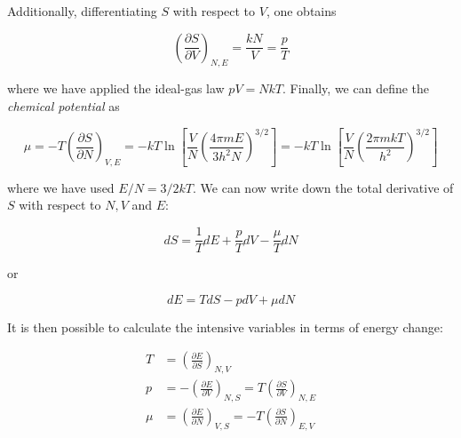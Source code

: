 \documentclass[12pt,a4paper]{report}
\newcommand{\esp}{\vspace{0.5cm}}
\begin{document}
	\esp
	
	\noindent Additionally, differentiating $S$ with respect to $V$, one obtains
	
	\esp
	
	\begin{equation}
		\left( \frac{\partial S}{\partial V} \right)_{N,E} = \frac{kN}{V} = \frac{p}{T}
	\end{equation}
	
	\esp
	
	\noindent where we have applied the ideal-gas law $pV = NkT$. Finally, we can define the \textit{chemical potential} as
	
	\esp
	
	\begin{equation}
		\mu = -T \left( \frac{\partial S}{\partial N} \right)_{V,E} = -kT \ln \left[ \frac{V}{N} \left( \frac{4\pi mE}{3h^2 N} \right)^{3/2} \right] = -kT \ln \left[ \frac{V}{N} \left( \frac{2\pi mkT}{h^2} \right)^{3/2} \right]
	\end{equation}
	
	\esp
	
	\noindent where we have used $E/N = 3/2 kT$. We can now write down the total derivative of $S$ with respect to $N, V$ and $E$:
	
	\esp
	
	\begin{equation}
		dS = \frac{1}{T} dE + \frac{p}{T} dV - \frac{\mu}{T} dN
	\end{equation}
	
	\esp
	
	\noindent or
	
	\esp
	
	\begin{equation}
		dE = T dS - p dV + \mu dN
	\end{equation}
	
	\esp
	
	\noindent It is then possible to calculate the intensive variables in terms of energy change:
	
	\esp
	
	\begin{align}
		T &= \left( \frac{\partial E}{\partial S} \right)_{N,V} \tag{4.85} \\
		p &= -\left( \frac{\partial E}{\partial V} \right)_{N,S} = T \left( \frac{\partial S}{\partial V} \right)_{N,E} \\
		\mu &= \left( \frac{\partial E}{\partial N} \right)_{V,S} = -T \left( \frac{\partial S}{\partial N} \right)_{E,V}
	\end{align}
	
\end{document}
